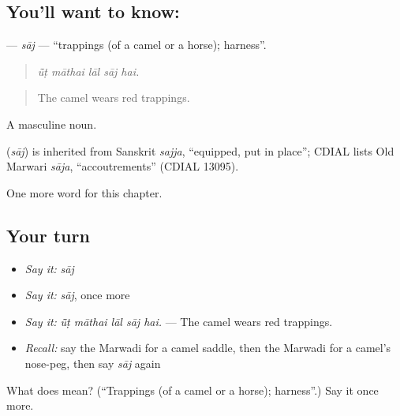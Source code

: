 \subsection*{You'll want to know: }
\textbf{} — \emph{sāj} — \textquotedblleft{}trappings (of a camel or a horse); harness\textquotedblright{}.

\begin{quote}
    
\end{quote}

\begin{quote}
\emph{ū̃ṭ māthai lāl sāj hai.}
\end{quote}

\begin{quote}
The camel wears red trappings.
\end{quote}

A masculine noun.

\begin{cousinweb}
\textbf{} (\emph{sāj}) is inherited from Sanskrit \emph{sajja}, \textquotedblleft{}equipped, put in place\textquotedblright{}; CDIAL lists Old Marwari \emph{sāja}, \textquotedblleft{}accoutrements\textquotedblright{} (CDIAL 13095).
\end{cousinweb}

\begin{grammarlens}[title={What you've built}]
One more word for this chapter.
\end{grammarlens}

\subsection*{Your turn}
\begin{itemize}
\raggedright
  \item \emph{Say it:} \emph{sāj}
  \item \emph{Say it:} \emph{sāj}, once more
  \item \emph{Say it:} \emph{ū̃ṭ māthai lāl sāj hai.} — The camel wears red trappings.
  \item \emph{Recall:} say the Marwadi for a camel saddle, then the Marwadi for a camel's nose-peg, then say \emph{sāj} again
\end{itemize}

\begin{tcolorbox}[breakable,colback=teal!4,colframe=teal!35!black,title={Before you move on}]
What does  mean? (\textquotedblleft{}Trappings (of a camel or a horse); harness\textquotedblright{}.) Say it once more.
\end{tcolorbox}
